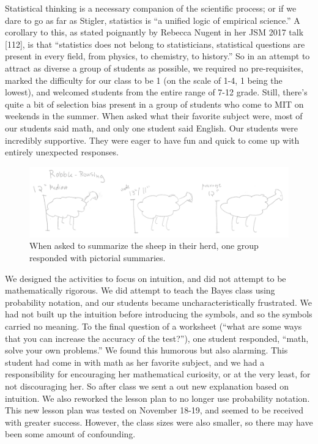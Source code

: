 \documentclass[12pt,twoside]{mitthesis-manusdown}
\begin{document}
Statistical thinking is a necessary companion of the scientific process;
or if we dare to go as far as Stigler, statistics is ``a unified logic
of empirical science.'' A corollary to this, as stated poignantly by
Rebecca Nugent in her JSM 2017 talk {[}112{]}, is that ``statistics does
not belong to statisticians, statistical questions are present in every
field, from physics, to chemistry, to history.'' So in an attempt to
attract as diverse a group of students as possible, we required no
pre-requisites, marked the difficulty for our class to be 1 (on the
scale of 1-4, 1 being the lowest), and welcomed students from the entire
range of 7-12 grade. Still, there's quite a bit of selection bias
present in a group of students who come to MIT on weekends in the
summer. When asked what their favorite subject were, most of our
students said math, and only one student said English. Our students were
incredibly supportive. They were eager to have fun and quick to come up
with entirely unexpected responses.
\begin{figure}[tb!]

{\centering \includegraphics[width=1\linewidth]{figuresteaching/sheep} 

}

\caption{\label{fig:sheep}When asked to summarize the sheep in their herd, one group responded with pictorial summaries.}\label{fig:sheep}
\end{figure}
We designed the activities to focus on intuition, and did not attempt to
be mathematically rigorous. We did attempt to teach the Bayes class
using probability notation, and our students became uncharacteristically
frustrated. We had not built up the intuition before introducing the
symbols, and so the symbols carried no meaning. To the final question of
a worksheet (``what are some ways that you can increase the accuracy of
the test?''), one student responded, ``math, solve your own problems.''
We found this humorous but also alarming. This student had come in with
math as her favorite subject, and we had a responsibility for
encouraging her mathematical curiosity, or at the very least, for not
discouraging her. So after class we sent a out new explanation based on
intuition. We also reworked the lesson plan to no longer use probability
notation. This new lesson plan was tested on November 18-19, and seemed
to be received with greater success. However, the class sizes were also
smaller, so there may have been some amount of confounding.
\end{document}
